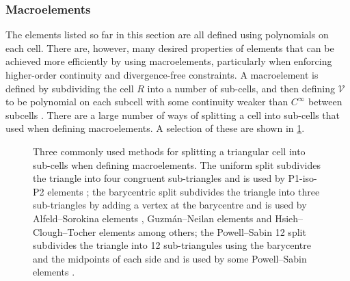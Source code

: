 \documentclass[sn-mathphys-num]{sn-jnl}%
\theoremstyle{thmstyleone}%
\newcommand{\refel}{R}
\newcommand{\polyspace}{\mathcal{V}}
\theoremstyle{thmstyletwo}%
\theoremstyle{thmstylethree}%
\begin{document}
\subsubsection{Macroelements}
The elements listed so far in this section are all defined using polynomials on each cell.
There are, however, many desired properties of elements that can be achieved more efficiently
by using macroelements, particularly when enforcing higher-order continuity and divergence-free constraints.
A macroelement is defined by subdividing the cell $\refel$ into a number of
sub-cells, and then defining $\polyspace$ to be polynomial on each subcell with some continuity weaker
than $C^\infty$ between subcells \cite{fiat-macro}. There are a large number of ways of splitting a cell
into sub-cells that used when defining macroelements. A selection of these are shown in \cref{fig:subcells}.

\begin{figure}
\centering
\footnotesize
{}
\caption{Three commonly used methods for splitting a triangular cell into sub-cells when defining macroelements.
The uniform split subdivides the triangle into four congruent sub-triangles and is used by P1-iso-P2 elements \cite{p1-iso-p2};
the barycentric split subdivides the triangle into three sub-triangles by adding a vertex at the barycentre and is used by Alfeld--Sorokina elements \cite{alfeld-sorokina}, Guzm\'an--Neilan elements \cite{guzman-neilan} and Hsieh--Clough--Tocher elements \cite{hct-0,hct-1,hct-2} among others;
the Powell--Sabin 12 split subdivides the triangle into 12 sub-triangules using the barycentre and the midpoints of each side and is used by some Powell--Sabin elements \cite{powell-sabin}.
}
\label{fig:subcells}
\end{figure}
\end{document}
